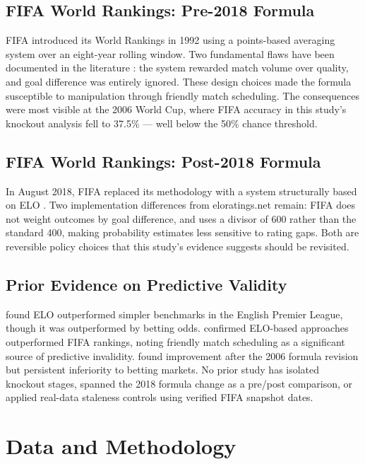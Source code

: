 \documentclass[12pt, a4paper]{article}
\begin{document}
\subsection{FIFA World Rankings: Pre-2018 Formula}

FIFA introduced its World Rankings in 1992 using a points-based averaging system over an
eight-year rolling window. Two fundamental flaws have been documented in the literature \cite{lasek2013}: the system
rewarded match volume over quality, and goal difference was entirely ignored. These design choices made the
formula susceptible to manipulation through friendly match scheduling. The consequences were
most visible at the 2006 World Cup, where FIFA accuracy in this study's knockout analysis fell
to 37.5\% --- well below the 50\% chance threshold.

\subsection{FIFA World Rankings: Post-2018 Formula}

In August 2018, FIFA replaced its methodology with a system structurally based on ELO
\cite{fifa2018}. Two implementation differences from eloratings.net remain: FIFA does not
weight outcomes by goal difference, and uses a divisor of 600 rather than the standard 400,
making probability estimates less sensitive to rating gaps. Both are reversible policy choices
that this study's evidence suggests should be revisited.

\subsection{Prior Evidence on Predictive Validity}

 found ELO outperformed simpler benchmarks in the English Premier League,
though it was outperformed by betting odds.  confirmed ELO-based approaches
outperformed FIFA rankings, noting friendly match scheduling as a significant source of
predictive invalidity.  found improvement after the 2006 formula revision
but persistent inferiority to betting markets. No prior study has isolated knockout stages,
spanned the 2018 formula change as a pre/post comparison, or applied real-data staleness controls
using verified FIFA snapshot dates.

\section{Data and Methodology}
\end{document}
